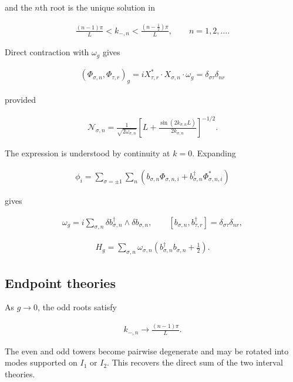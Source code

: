 and the $n$th root is the unique solution in

\begin{align}
\frac{(n-1)\pi}{L}<k_{-,n}<\frac{(n-\frac12)\pi}{L},
\qquad
n=1,2,\ldots.
\end{align}

Direct contraction with $\omega_g$ gives

\begin{align}
(\Phi_{\sigma,n},\Phi_{\tau,r})_g
=iX_{\tau,r}^*\mathbin{\cdot}X_{\sigma,n}\mathbin{\cdot}\omega_g
=\delta_{\sigma\tau}\delta_{nr}
\end{align}

provided

\begin{align}
\mathcal N_{\sigma,n}
=\frac{1}{\sqrt{2\omega_{\sigma,n}}}
\left[
L+\frac{\sin(2k_{\sigma,n}L)}{2k_{\sigma,n}}
\right]^{-1/2}.
\end{align}

The expression is understood by continuity at $k=0$. Expanding

\begin{align}
\phi_i
=\sum_{\sigma=\pm1}\sum_n
\left(
b_{\sigma,n}\Phi_{\sigma,n,i}
+b_{\sigma,n}^\dagger\Phi_{\sigma,n,i}^*
\right)
\end{align}

gives

\begin{align}
\omega_g=i\sum_{\sigma,n}\delta b_{\sigma,n}^\dagger\wedge\delta b_{\sigma,n},
\qquad
[b_{\sigma,n},b_{\tau,r}^\dagger]
=\delta_{\sigma\tau}\delta_{nr},
\end{align}

\begin{align}
H_g=\sum_{\sigma,n}\omega_{\sigma,n}
\left(b_{\sigma,n}^\dagger b_{\sigma,n}+\frac12\right).
\end{align}

\subsection{Endpoint theories}\label{subsec:interval-endpoints}

As $g\to0$, the odd roots satisfy

\begin{align}
k_{-,n}\longrightarrow\frac{(n-1)\pi}{L}.
\end{align}

The even and odd towers become pairwise degenerate and may be rotated into modes supported on $I_1$ or $I_2$. This recovers the direct sum of the two interval theories.

